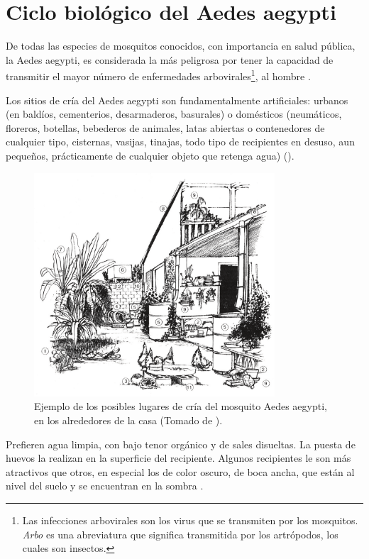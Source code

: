 
\section{Ciclo biológico del Aedes aegypti}
\label{sec:caracteristicas-biologicas}
De todas las especies de mosquitos conocidos, con importancia en salud pública, la Aedes aegypti,
es considerada la más peligrosa por tener la capacidad de transmitir el mayor número de enfermedades arbovirales\footnote{Las infecciones arbovirales son los virus que se transmiten por
los mosquitos. \textit{Arbo} es una abreviatura que significa transmitida por los artrópodos, los
cuales son insectos.}, al hombre \cite{ThironIzcazaJ2003}.

Los sitios de cría del Aedes aegypti son fundamentalmente artificiales: urbanos (en baldíos,
cementerios, desarmaderos, basurales) o domésticos (neumáticos, floreros, botellas, bebederos de
animales, latas abiertas o contenedores de cualquier tipo, cisternas, vasijas, tinajas, todo tipo
de recipientes en desuso, aun pequeños, prácticamente de cualquier objeto que retenga agua)
\cite{world2009dengue, directricesDetvArg} ().

\begin{figure}[!htbp]
\centering
\includegraphics[width=0.8\textwidth]{capitulo-3/graphics/criaderos-domicilio.png}
\caption{\label{fig:lugares-criaderos} Ejemplo de los posibles lugares de cría del mosquito Aedes
aegypti, en los alrededores de la casa (Tomado de \cite{manualControlArg2009}).}
\end{figure}


Prefieren agua limpia, con bajo tenor orgánico y de sales disueltas. La puesta de huevos la
realizan en la superficie del recipiente. Algunos recipientes le son más atractivos que otros, en
especial los de color oscuro, de boca ancha, que están al nivel del suelo y se encuentran en la
sombra \cite{ThironIzcazaJ2003}.

